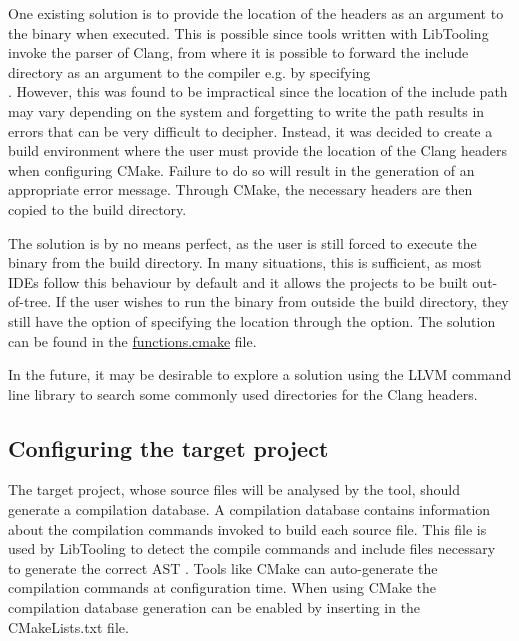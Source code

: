 One existing solution is to provide the location of the headers as an argument to the binary when executed. This is possible since tools written with LibTooling invoke the parser of Clang, from where it is possible to forward the include directory as an argument to the compiler e.g. by specifying\\.
However, this was found to be impractical since the location of the include path may vary depending on the system and forgetting to write the path results in errors that can be very difficult to decipher.
Instead, it was decided to create a build environment where the user must provide the location of the Clang headers when configuring CMake. Failure to do so will result in the generation of an appropriate error message. Through CMake, the necessary headers are then copied to the build directory.

The solution is by no means perfect, as the user is still forced to execute the binary from the build directory. In many situations, this is sufficient, as most IDEs follow this behaviour by default and it allows the projects to be built out-of-tree. If the user wishes to run the binary from outside the build directory, they still have the option of specifying the location through the  option. The solution can be found in the \href{https://github.com/mortenhaahr/RD/blob/main/examples/c_style_array_converter/cmake/functions.cmake}{functions.cmake} file.

In the future, it may be desirable to explore a solution using the LLVM command line library to search some commonly used directories for the Clang headers.

\pagebreak
\subsection{Configuring the target project}

The target project, whose source files will be analysed by the tool, should generate a compilation database. A compilation database contains information about the compilation commands invoked to build each source file. This file is used by LibTooling to detect the compile commands and include files necessary to generate the correct AST \cite{clangJSONCompilationDatabase}. Tools like CMake can auto-generate the compilation commands at configuration time. When using CMake the compilation database generation can be enabled by inserting  in the CMakeLists.txt file.